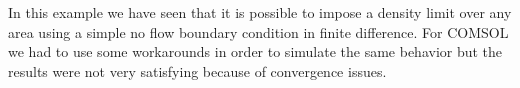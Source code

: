 In this example we have seen that it is possible to impose a density limit over any area using a simple no flow boundary condition in finite difference. For COMSOL we had to use some workarounds in order to simulate the same behavior but the results were not very satisfying because of convergence issues.